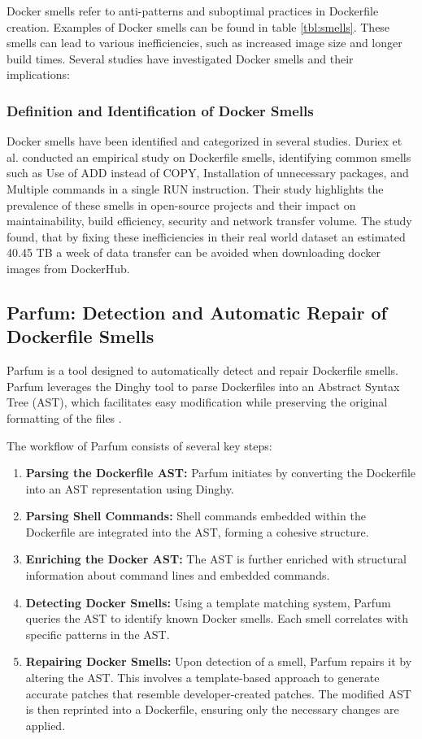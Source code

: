 \documentclass[conference]{IEEEtran}
\begin{document}
Docker smells refer to anti-patterns and suboptimal practices in Dockerfile creation. Examples of Docker smells can be found in table \ref{tbl:smells}. These smells can lead to various inefficiencies, such as increased image size and longer build times. Several studies have investigated Docker smells and their implications:

\subsubsection{Definition and Identification of Docker Smells}
Docker smells have been identified and categorized in several studies. Duriex et al. \cite{durieuxEmpericalStudy} conducted an empirical study on Dockerfile smells, identifying common smells such as Use of ADD instead of COPY, Installation of unnecessary packages, and Multiple commands in a single RUN instruction. Their study highlights the prevalence of these smells in open-source projects and their impact on maintainability, build efficiency, security and network transfer volume. The study found, that by fixing these inefficiencies in their real world dataset an estimated 40.45 TB a week of data transfer can be avoided when downloading docker images from DockerHub.

\subsection{Parfum: Detection and Automatic Repair of Dockerfile Smells}

Parfum is a tool designed to automatically detect and repair Dockerfile smells. Parfum leverages the Dinghy tool to parse Dockerfiles into an Abstract Syntax Tree (AST), which facilitates easy modification while preserving the original formatting of the files \cite{durieux2023parfumdetectionautomaticrepair}.

The workflow of Parfum consists of several key steps:

\begin{enumerate}
    \item \textbf{Parsing the Dockerfile AST:} Parfum initiates by converting the Dockerfile into an AST representation using Dinghy.
    \item \textbf{Parsing Shell Commands:} Shell commands embedded within the Dockerfile are integrated into the AST, forming a cohesive structure.
    \item \textbf{Enriching the Docker AST:} The AST is further enriched with structural information about command lines and embedded commands.
    \item \textbf{Detecting Docker Smells:} Using a template matching system, Parfum queries the AST to identify known Docker smells. Each smell correlates with specific patterns in the AST.
    \item \textbf{Repairing Docker Smells:} Upon detection of a smell, Parfum repairs it by altering the AST. This involves a template-based approach to generate accurate patches that resemble developer-created patches. The modified AST is then reprinted into a Dockerfile, ensuring only the necessary changes are applied.
\end{enumerate}
\end{document}
